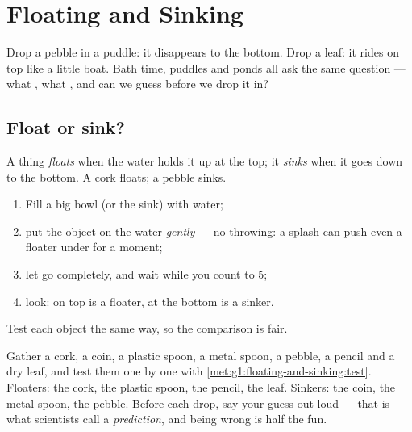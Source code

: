 \chapter{Floating and Sinking}\label{ch:g1:floating-and-sinking}

Drop a pebble in a puddle: it disappears to the bottom. Drop a leaf:
it rides on top like a little boat. Bath time, puddles and ponds all
ask the same question --- what , what , and can we guess
before we drop it in?

\section{Float or sink?}

\begin{definition}\label{def:g1:floating-and-sinking:words}
A thing \emph{floats} when the water holds it up at the
top; it \emph{sinks} when it goes down to the bottom.
A cork floats; a pebble sinks.
\end{definition}

\begin{method}\label{met:g1:floating-and-sinking:test}
\begin{enumerate}
  \item Fill a big bowl (or the sink) with water;
  \item put the object on the water \emph{gently} --- no throwing:
        a splash can push even a floater under for a moment;
  \item let go completely, and wait while you count to $5$;
  \item look: on top is a floater, at the bottom is a sinker.
\end{enumerate}
Test each object the same way, so the comparison is fair.
\end{method}

\begin{example}\label{ex:g1:floating-and-sinking:sorting}
Gather a cork, a coin, a plastic spoon, a metal spoon, a pebble, a
pencil and a dry leaf, and test them one by one with
\cref{met:g1:floating-and-sinking:test}. Floaters: the cork, the
plastic spoon, the pencil, the leaf. Sinkers: the coin, the metal
spoon, the pebble. Before each drop, say your guess out loud ---
that is what scientists call a \emph{prediction}, and being wrong is
half the fun.
\end{example}

